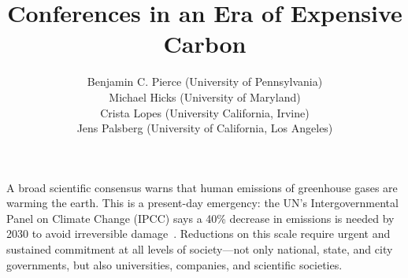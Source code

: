 \documentclass[12pt]{article}
\begin{document}
\title{\Huge Conferences in an Era of Expensive Carbon}
\author{Benjamin C. Pierce (University of Pennsylvania) \\
Michael Hicks (University of Maryland) \\
Crista Lopes (University California, Irvine) \\
Jens Palsberg (University of California, Los Angeles)}

\maketitle




A broad scientific consensus warns that human
emissions of greenhouse gases are warming the earth.
This is a present-day emergency: the UN's Intergovernmental
Panel on Climate Change (IPCC) says a 40\% decrease in
emissions is needed by 2030 to avoid irreversible damage~\cite{IPCC18}.
Reductions on this scale
require urgent and sustained commitment at all levels of society---not only
national, state, and city governments, but also
universities, companies, and scientific societies.


\end{document}
